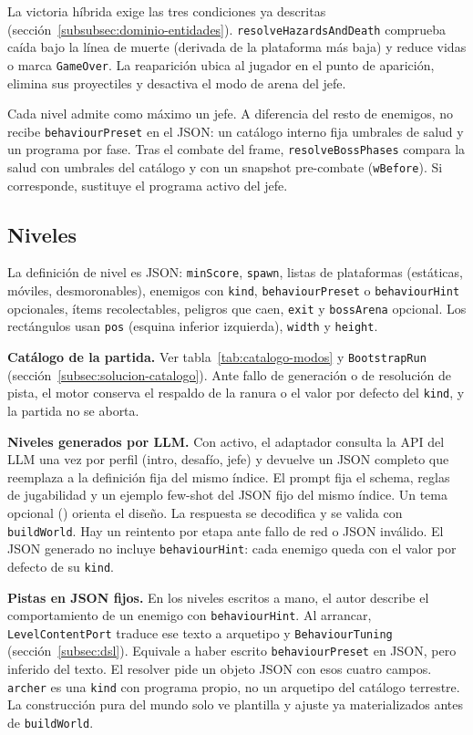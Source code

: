 La victoria híbrida exige las tres condiciones ya descritas
(sección~\ref{subsubsec:dominio-entidades}).
\texttt{resolveHazardsAndDeath} comprueba caída bajo la línea de muerte (derivada de la
plataforma más baja) y reduce vidas o marca \texttt{GameOver}. La reaparición ubica al
jugador en el punto de aparición, elimina sus proyectiles y desactiva el modo de arena del jefe.

Cada nivel admite como máximo un jefe. A diferencia del resto de enemigos, no
recibe \texttt{behaviourPreset} en el JSON: un catálogo interno fija umbrales de
salud y un programa por fase. Tras el combate del frame,
\texttt{resolveBossPhases} compara la salud con umbrales del catálogo y con un snapshot
pre-combate (\texttt{wBefore}). Si corresponde, sustituye el programa activo del jefe.

\subsection{Niveles}
\label{subsec:niveles}

La definición de nivel es JSON: \texttt{minScore}, \texttt{spawn}, listas de
plataformas (estáticas, móviles, desmoronables), enemigos con \texttt{kind},
\texttt{behaviour\-Preset} o \texttt{behaviour\-Hint} opcionales, ítems recolectables,
peligros que caen, \texttt{exit} y \texttt{bossArena} opcional. Los
rectángulos usan \texttt{pos} (esquina inferior izquierda), \texttt{width} y \texttt{height}.

\textbf{Catálogo de la partida.} Ver tabla~\ref{tab:catalogo-modos} y
\texttt{BootstrapRun} (sección~\ref{subsec:solucion-catalogo}). Ante fallo de generación o
de resolución de pista, el motor conserva el respaldo de la ranura o el
valor por defecto del \texttt{kind}, y la partida no se aborta.

\textbf{Niveles generados por LLM.} Con  activo, el
adaptador consulta la API del LLM una vez por perfil (intro, desafío, jefe) y devuelve
un JSON completo que reemplaza a la definición fija del mismo índice. El prompt
fija el schema, reglas
de jugabilidad y un ejemplo few-shot del JSON fijo del mismo índice. Un tema
opcional () orienta el diseño. La respuesta se decodifica
y se valida con \texttt{buildWorld}. Hay un reintento por etapa ante fallo de red o JSON
inválido. El JSON generado no incluye \texttt{behaviourHint}: cada enemigo queda con
el valor por defecto de su \texttt{kind}.

\textbf{Pistas en JSON fijos.} En los niveles escritos a mano, el autor describe el
comportamiento de un enemigo con \texttt{behaviour\-Hint}. Al arrancar,
\texttt{LevelContentPort} traduce ese texto a arquetipo y
\texttt{Behaviour\-Tuning} (sección~\ref{subsec:dsl}). Equivale a
haber escrito \texttt{behaviourPreset} en JSON, pero inferido del texto. El resolver pide
un objeto JSON con esos cuatro campos. \texttt{archer} es una \texttt{kind} con programa
propio, no un arquetipo del catálogo terrestre. La construcción pura del mundo solo
ve plantilla y ajuste ya materializados antes de \texttt{buildWorld}.


